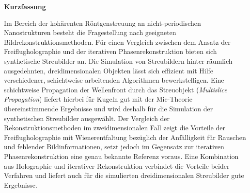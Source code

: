 	\begin{Huge}
		\textbf{Kurzfassung}\vspace{12mm}
	\end{Huge}
	
	Im Bereich der kohärenten Röntgenstreuung an nicht-periodischen Nanostrukturen besteht die Fragestellung nach geeigneten Bildrekonstruktionsmethoden. Für einen Vergleich zwischen dem Ansatz der Freiflugholographie und der iterativen Phasenrekonstruktion bieten sich synthetische Streubilder an. Die Simulation von Streubildern hinter räumlich ausgedehnten, dreidimensionalen Objekten lässt sich effizient mit Hilfe verschiedener, schichtweise arbeitenden Algorithmen bewerkstelligen. Eine schichtweise Propagation der Wellenfront durch das Streuobjekt (\textit{Multislice Propagation}) liefert hierbei für Kugeln gut mit der Mie-Theorie übereinstimmende Ergebnisse und wird deshalb für die Simulation der synthetischen Streubilder ausgewählt. Der Vergleich der Rekonstruktionsmethoden im zweidimensionalen Fall zeigt die Vorteile der Freiflugholographie mit Wienerentfaltung bezüglich der Anfälligkeit für Rauschen und fehlender Bildinformationen, setzt jedoch im Gegensatz zur iterativen Phasenrekonstruktion eine genau bekannte Referenz voraus. Eine Kombination aus Holographie und iterativer Rekonstruktion verbindet die Vorteile beider Verfahren und liefert auch für die simulierten dreidimensionalen Streubilder gute Ergebnisse.
